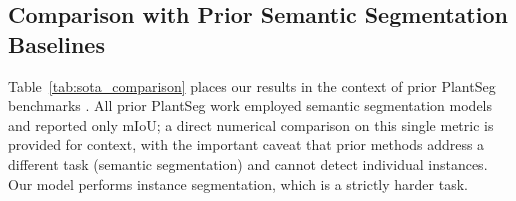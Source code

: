\documentclass[preprint,12pt]{elsarticle}
\begin{document}
\subsection{Comparison with Prior Semantic Segmentation Baselines}

Table~\ref{tab:sota_comparison} places our results in the context of prior PlantSeg benchmarks \citep{plantseg2024}. All prior PlantSeg work employed semantic segmentation models and reported only mIoU; a direct numerical comparison on this single metric is provided for context, with the important caveat that prior methods address a different task (semantic segmentation) and cannot detect individual instances. Our model performs instance segmentation, which is a strictly harder task.

\begin{table}[h]
\centering
\caption{Comparison with prior PlantSeg benchmarks \citep{plantseg2024}. Training hardware and time were not reported by PlantSeg authors and are omitted to avoid unverified claims. $\dagger$ = parameter and GFLOP estimates from the original architecture papers, not from PlantSeg training logs. \textit{Note}: prior methods perform semantic segmentation; mIoU comparison is provided as context only, as tasks differ.}
\label{tab:sota_comparison}
\end{table}
\end{document}
